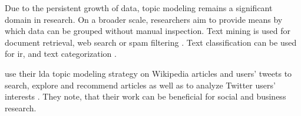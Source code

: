 
Due to the persistent growth of data, topic modeling remains a significant domain in research.
On a broader scale, researchers aim to provide means by which data can be grouped without manual inspection.
Text mining is used for document retrieval, web search or spam filtering \cite{clusteringDocs2020}.
Text classification can be used for \ac{ir}, and text categorization \cite{tfidf2008}.

\citeauthor{text_mining2016} use their \ac{lda} topic modeling strategy on Wikipedia articles and users' tweets to search, explore and recommend articles 
as well as to analyze Twitter users' interests \cite{text_mining2016}.
They note, that their work can be beneficial for social and business research.
